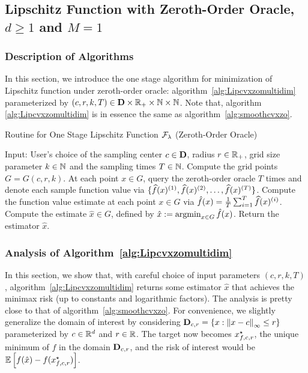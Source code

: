 \subsection{Lipschitz Function with Zeroth-Order Oracle, $d \geq 1$ and $M = 1$}
\subsubsection{Description of Algorithms}
In this section, we introduce the one stage algorithm for minimization of Lipschitz function 
under zeroth-order oracle: algorithm~\ref{alg:Lipcvxzomultidim} parameterized by 
$(c, r, k, T) \in \mathbf{D} \times \mathbb{R}_+ \times \mathbb{N} \times \mathbb{N}$. Note that, algorithm 
\ref{alg:Lipcvxzomultidim} is in essence the same as algorithm~\ref{alg:smoothcvxzo}. 

\begin{algorithm}[htp]
\caption{Routine for One Stage Lipschitz Function $\mathcal{F}_\lambda$ (Zeroth-Order Oracle)}  %
\begin{algorithmic}[1]  %
\Statex Input: User's choice of the sampling center $c \in \mathbf{D}$, radius $r\in \mathbb{R}_+$, 
	grid size parameter $k\in \mathbb{N}$ and the sampling times $T \in \mathbb{N}$.
\State Compute the grid points $G = G(c, r, k)$.
\State At each point $x\in G$, query the zeroth-order oracle $T$ times and denote each 
	sample function value via $\{\widehat{f}(x)^{(1)}, \widehat{f} (x)^{(2)}, \ldots, 
		\widehat{f} (x)^{(T)}\}$.
\State Compute the function value estimate at each point $x\in G$ via 
	$\hat{f}(x) = \frac{1}{T} \sum_{i=1}^T \widehat{f}(x)^{(i)}$.
\State Compute the estimate $\hat{x} \in G$, defined by
	$\hat{x} \defeq \argmin_{x\in G}\hat{f}(x)$.
\State Return the estimator $\hat x$.
\end{algorithmic}
\label{alg:Lipcvxzomultidim}
\end{algorithm}

\subsubsection{Analysis of Algorithm~\ref{alg:Lipcvxzomultidim}}
In this section, we show that, with careful choice of input parameters $(c, r, k, T)$, 
algorithm~\ref{alg:Lipcvxzomultidim} returns some estimator $\hat{x}$ that achieves 
the minimax risk (up to constants and logarithmic factors). The analysis 
is pretty close to that of algorithm~\ref{alg:smoothcvxzo}. For convenience, we slightly generalize 
the domain of interest by considering $\mathbf{D}_{c, r} = \{x: \left\|{x-c}\right\|_\infty \leq r\}$
parameterized by $c\in \mathbb{R}^d$ and $r\in \mathbb{R}$. The target now becomes $x_{f, c, r}^\star$,
the unique minimum of $f$ in the domain $\mathbf{D}_{c, r}$, and the risk of interest 
would be $\mathbb{E} \left[f(\hat{x}) - f(x_{f, c, r}^\star)\right]$. 

